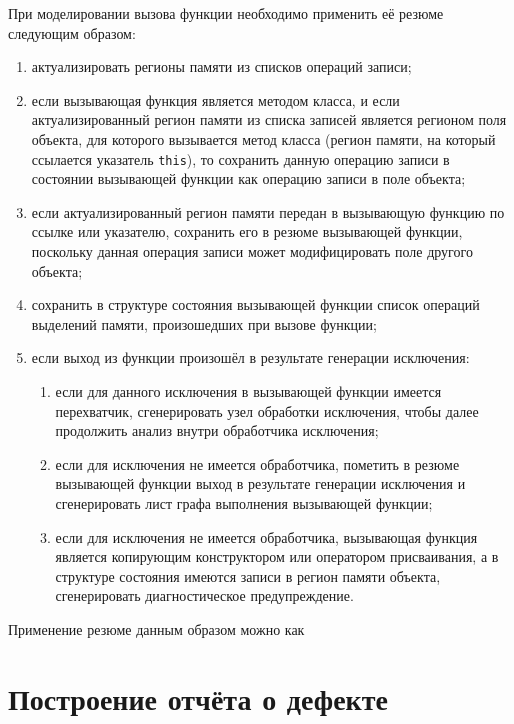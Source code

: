 При моделировании вызова функции необходимо применить её резюме следующим образом:

\begin{enumerate}
 \item актуализировать регионы памяти из списков операций записи;
 \item если вызывающая функция является методом класса, и если актуализированный регион памяти из списка записей является регионом поля объекта, для которого вызывается метод класса (регион памяти, на который ссылается указатель \texttt{this}), то сохранить данную операцию записи в состоянии вызывающей функции как операцию записи в поле объекта;
 \item если актуализированный регион памяти передан в вызывающую функцию по ссылке или указателю, сохранить его в резюме вызывающей функции, поскольку данная операция записи может модифицировать поле другого объекта;
 \item сохранить в структуре состояния вызывающей функции список операций выделений памяти, произошедших при вызове функции;
 \item если выход из функции произошёл в результате генерации исключения:
 \begin{enumerate}
  \item если для данного исключения в вызывающей функции имеется перехватчик, сгенерировать узел обработки исключения, чтобы далее продолжить анализ внутри обработчика исключения;
  \item если для исключения не имеется обработчика, пометить в резюме вызывающей функции выход в результате генерации исключения и сгенерировать лист графа выполнения вызывающей функции;
  \item если для исключения не имеется обработчика, вызывающая функция является копирующим конструктором или оператором присваивания, а в структуре состояния имеются записи в регион памяти объекта, сгенерировать диагностическое предупреждение.
 \end{enumerate}
\end{enumerate}

Применение резюме данным образом можно как 

\section{Построение отчёта о дефекте}


